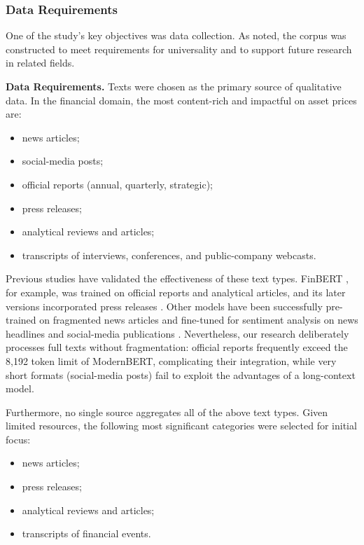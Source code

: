 \subsubsection{Data Requirements}
\label{sec:data_req}
One of the study's key objectives was data collection. As noted, the corpus was constructed to meet requirements
for universality and to support future research in related fields.

\textbf{Data Requirements.} Texts were chosen as the primary source of qualitative data. In the financial domain,
the most content-rich and impactful on asset prices are:

\begin{itemize}
    \item news articles;
    \item social-media posts;
    \item official reports (annual, quarterly, strategic);
    \item press releases;
    \item analytical reviews and articles;
    \item transcripts of interviews, conferences, and public-company webcasts.
\end{itemize}

Previous studies have validated the effectiveness of these text types. FinBERT \parencite{Yang2020FinBERT,Huang2023FinBERT},
for example, was trained on official reports and analytical articles, and its later versions incorporated press releases
\parencite{Liu2020FinBERT}. Other models have been successfully pre-trained on fragmented news articles and fine-tuned
for sentiment analysis on news headlines and social-media publications \parencite{Araci2019FinBERT}. Nevertheless,
our research deliberately processes full texts without fragmentation: official reports frequently exceed the 8,192
token limit of ModernBERT, complicating their integration, while very short formats (social-media posts) fail
to exploit the advantages of a long-context model.

Furthermore, no single source aggregates all of the above text types. Given limited resources, the following most
significant categories were selected for initial focus:

\begin{itemize}
    \item news articles;
    \item press releases;
    \item analytical reviews and articles;
    \item transcripts of financial events.
\end{itemize}

